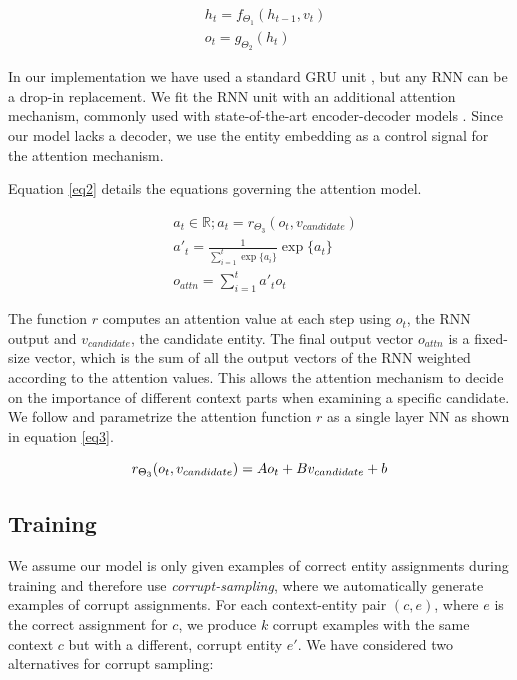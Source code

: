 \documentclass[11pt]{article}
\begin{document}
	\begin{equation}
	\label{eq1}
	\begin{aligned}
	& h_t=f_{\Theta_1}(h_{t-1}, v_t) \\
	& o_t=g_{\Theta_2}(h_t)
	\end{aligned}
	\end{equation}
	
	In our implementation we have used a standard GRU unit \cite{cho2014learning}, but any RNN can be a drop-in replacement. We fit the RNN unit with an additional attention mechanism, commonly used with state-of-the-art encoder-decoder models \cite{bahdanau2014neural,xu2015show}. Since our model lacks a decoder, we use the entity embedding as a control signal for the attention mechanism.
	
	Equation \ref{eq2} details the equations governing the attention model.
	
	\begin{equation}
	\label{eq2}
	\begin{aligned}
	& a_t \in \mathbb{R}; a_t=r_{\Theta_3}(o_t, v_{candidate}) \\
	& a'_t  = \frac{1}{\sum_{i=1}^{t} \exp\{a_i\}} \exp \{a_t\} \\
	& o_{attn}=\sum_{i=1}^{t} a'_t o_t
	\end{aligned}
	\end{equation}
	
	The function $r$ computes an attention value at each step using $o_t$, the RNN output and $v_{candidate}$, the candidate entity. The final output vector $o_{attn}$ is a fixed-size vector, which is the sum of all the output vectors of the RNN weighted according to the attention values. This allows the attention mechanism to decide on the importance of different context parts when examining a specific candidate. We follow  and parametrize the attention function $r$ as a single layer NN as shown in equation \ref{eq3}.
	
	\begin{equation}
	\label{eq3}
	r_{\Theta_3}(o_t, v_{candidate}) = Ao_t + Bv_{candidate} + b \\
	\end{equation}
	
	\subsection{Training}
	
	We assume our model is only given examples of correct entity assignments during training and therefore use \textit{corrupt-sampling}, where we automatically generate examples of corrupt assignments. For each context-entity pair $(c,e)$, where $e$ is the correct assignment for $c$, we produce $k$ corrupt examples with the same context $c$ but with a different, corrupt entity $e'$. We have considered two alternatives for corrupt sampling:
	
\end{document}
